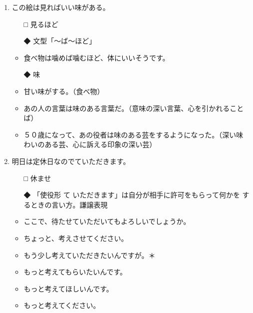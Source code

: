 \documentclass[
uplatex,
b5paper,
10pt,
dvipdfmx
]{jsbook}
\begin{document}
\begin{enumerate}
\item この絵は見れば\underline{\hspace{3zw}}いい味がある。
\begin{itemize}
\item[□] 見るほど
\item[◆] 文型「〜ば〜ほど」
\end{itemize}
\begin{itemize}
\item 食べ物は噛めば噛むほど、体にいいそうです。 
\end{itemize}
\begin{itemize}
\item[◆] 味
\end{itemize}
\begin{itemize}
 \item 甘い味がする。（食べ物） 
 \item あの人の言葉は味のある言葉だ。（意味の深い言葉、心を引かれることば） 
 \item ５０歳になって、あの役者は味のある芸をするようになった。（深い味
       わいのある芸、心に訴える印象の深い芸）
\end{itemize}

\item 明日は定休日なので\underline{\hspace{3zw}}ていただきます。
\begin{itemize}
\item[□] 休ませ
\item[◆] 「使役形 て いただきます」は自分が相手に許可をもらって何かを
	  するときの言い方。謙譲表現
\end{itemize}
\begin{itemize}
 \item ここで、待たせていただいてもよろしいでしょうか。 
 \item ちょ{}っと、考えさせてください。 
 \item もう少し考えていただきたいんですが。＊
 \item もっと考えてもらいたいんです。 
 \item もっと考えてほしいんです。 
 \item もっと考えてください。 
\end{itemize}


\end{enumerate}
\end{document}
